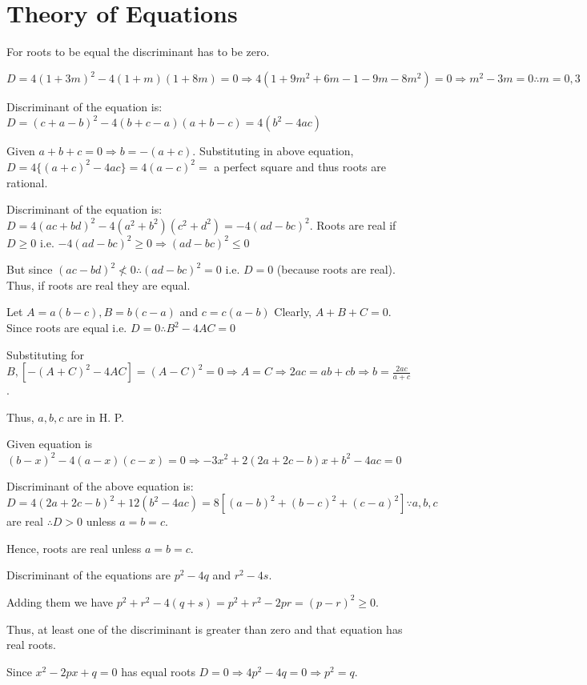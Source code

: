 \chapter{Theory of Equations}
\startitemize[n, 1*broad]
\item For roots to be equal the discriminant has to be zero.

   $D = 4(1 + 3m)^2 - 4(1 + m)(1 + 8m) = 0\Rightarrow 4(1 + 9m^2 + 6m - 1 - 9m -8m^2) = 0\Rightarrow m^2 -
  3m = 0 \therefore m = 0, 3$
\item Discriminant of the equation is: $D = (c + a - b)^2 - 4(b + c - a)(a + b -c) = 4(b^2 - 4ac)$

  Given $a + b + c = 0 \Rightarrow b = -(a + c).$ Substituting in above equation, $D = 4\{(a + c)^2 - 4ac\}
  = 4(a - c)^2 =$ a perfect square and thus roots are rational.
\item Discriminant of the equation is: $D = 4(ac + bd)^2 - 4(a^2 + b^2)(c^2 + d^2) = -4(ad - bc)^2$. Roots
  are real if $D\geq 0$ i.e. $-4(ad - bc)^2 \geq 0 \Rightarrow (ad - bc)^2 \leq 0$

  But since $(ac - bd)^2 \nless 0 \therefore (ad - bc)^2 = 0$ i.e. $D = 0$ (because roots are real). Thus,
  if roots are real they are equal.
\item Let $A = a(b - c), B = b(c - a)$ and $c = c(a - b)$ Clearly, $A + B + C = 0$. Since roots are equal
  i.e. $D = 0 \therefore B^2 - 4AC = 0$

  Substituting for $B, [-(A + C)^2 - 4AC] = (A - C)^2 = 0 \Rightarrow A = C \Rightarrow 2ac = ab + cb
  \Rightarrow b = \frac{2ac}{a + c}$.

  Thus, $a, b, c$ are in H. P.
\item Given equation is $(b - x)^2 - 4(a - x)(c - x) = 0\Rightarrow -3x^2 + 2(2a + 2c - b)x + b^2 - 4ac = 0$

  Discriminant of the above equation is: $D = 4(2a + 2c - b)^2 + 12(b^2 - 4ac) = 8[(a - b)^2 + (b - c)^2 +
    (c - a)^2]\because a, b, c$ are real $\therefore D > 0$ unless $a = b = c$.

  Hence, roots are real unless $a = b = c$.
\item Discriminant of the equations are $p^2 - 4q$ and $r^2 - 4s$.

  Adding them we have $p^2 + r^2 - 4(q + s) = p^2 + r^2 - 2pr = (p - r)^2 \geq 0$.

  Thus, at least one of the discriminant is greater than zero and that equation has real roots.
\item Since $x^2 - 2px + q = 0$ has equal roots $D = 0 \Rightarrow 4p^2 - 4q = 0 \Rightarrow p^2 = q$.

